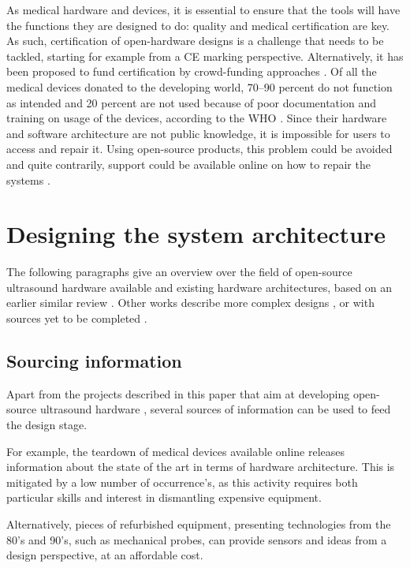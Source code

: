 \documentclass{article}
\begin{document}
As medical hardware and devices, it is essential to ensure that the tools will have the functions they are designed to do: quality and medical certification are key. As such, certification of open-hardware designs is a challenge that needs to be tackled, starting for example from a CE marking perspective. Alternatively, it has been proposed to fund certification by crowd-funding approaches \cite{de_maria_safe_2018}. Of all the medical devices donated to the developing world, 70–90 percent do not function as intended and 20 percent are not used because of poor documentation and training on usage of the devices, according to the WHO \cite{niezen_open-source_2016}. Since their hardware and software architecture are not public knowledge, it is impossible for users to access and repair it. Using open-source products, this problem could be avoided and quite contrarily, support could be available online on how to repair the systems \cite{gibney_open-hardware_2016}.

\newpage
\section{Designing the system architecture}

The following paragraphs give an overview over the field of open-source ultrasound hardware available and existing hardware architectures, based on an earlier similar review \cite{jonveaux_arduino-like_2017}.
Other works describe more complex designs \cite{roman_open-source_2019}, or with sources yet to be completed \cite{enwia_open-source_2019,echopen_echopen_nodate}.


\subsection{Sourcing information}

Apart from the projects described in this paper that aim at developing open-source ultrasound hardware \cite{roman_open-source_2019,luc_jonveaux_un0rick_2019}, several sources of information can be used to feed the design stage.  

For example, the teardown of medical devices available online releases information about the state of the art in terms of hardware architecture. This is mitigated by a low number of occurrence's, as this activity requires both particular skills and interest in dismantling expensive equipment. 

Alternatively, pieces of refurbished equipment, presenting technologies from the 80's and 90's, such as mechanical probes, can provide sensors and ideas from a design perspective, at an affordable cost.  
\end{document}
